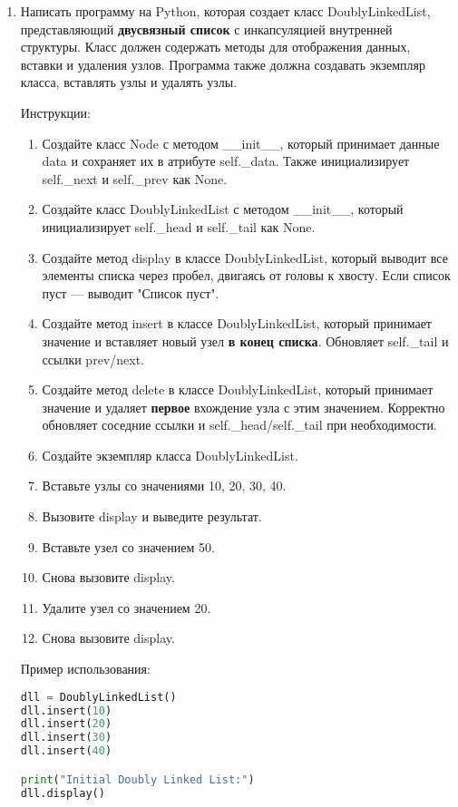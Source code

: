 \begin{enumerate}
\item Написать программу на Python, которая создает класс DoublyLinkedList, представляющий \textbf{двусвязный список} с инкапсуляцией внутренней структуры. Класс должен содержать методы для отображения данных, вставки и удаления узлов. Программа также должна создавать экземпляр класса, вставлять узлы и удалять узлы.

Инструкции:
\begin{enumerate}
    \item Создайте класс Node с методом \_\_init\_\_, который принимает данные data и сохраняет их в атрибуте self.\_data. Также инициализирует self.\_next и self.\_prev как None.
    \item Создайте класс DoublyLinkedList с методом \_\_init\_\_, который инициализирует self.\_head и self.\_tail как None.
    \item Создайте метод display в классе DoublyLinkedList, который выводит все элементы списка через пробел, двигаясь от головы к хвосту. Если список пуст — выводит "Список пуст".
    \item Создайте метод insert в классе DoublyLinkedList, который принимает значение и вставляет новый узел \textbf{в конец списка}. Обновляет self.\_tail и ссылки prev/next.
    \item Создайте метод delete в классе DoublyLinkedList, который принимает значение и удаляет \textbf{первое} вхождение узла с этим значением. Корректно обновляет соседние ссылки и self.\_head/self.\_tail при необходимости.
    \item Создайте экземпляр класса DoublyLinkedList.
    \item Вставьте узлы со значениями 10, 20, 30, 40.
    \item Вызовите display и выведите результат.
    \item Вставьте узел со значением 50.
    \item Снова вызовите display.
    \item Удалите узел со значением 20.
    \item Снова вызовите display.
\end{enumerate}

Пример использования:
\begin{lstlisting}[language=Python]
dll = DoublyLinkedList()
dll.insert(10)
dll.insert(20)
dll.insert(30)
dll.insert(40)

print("Initial Doubly Linked List:")
dll.display()


\end{lstlisting}
\end{enumerate}

